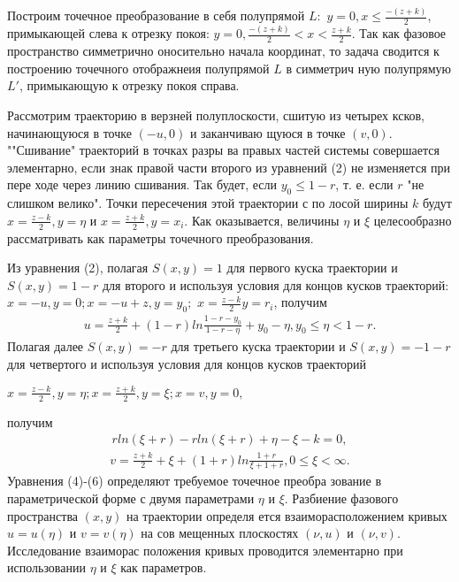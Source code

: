 \documentclass{article}
\begin{document}
Построим точечное преобразование в себя полупрямой $L:$
$y=0, x\leq\frac{-(z+k)}{2}$, примыкающей слева к отрезку покоя: $y
=0, \frac{-(z+k)}{2}<x<\frac{z+k}{2}$. Так как фазовое пространство
симметрично оносительно начала координат, то задача сводится
к построению точечного отображнеия полупрямой $L$ в симметрич
ную полупрямую $L'$, примыкающую к отрезку покоя справа.%

Рассмотрим траекторию в верзней полуплоскости, сшитую из
четырех ксков, начинающуюся в точке $(-u, 0)$ и заканчиваю
щуюся в точке $(v,0)$. ""Сшивание" траекторий в точках разры
ва правых частей системы совершается элементарно, если знак
правой части второго из уравнений (2) не изменяется при пере
ходе через линию сшивания. Так будет, если $y_{0}\leq1-r$, т. е. если
$r$ "не слишком велико". Точки пересечения этой траектории с по
лосой ширины $k$ будут $x=\frac{z-k}{2}, y=\eta$ и $x=\frac{z+k}{2}, y=x_{i}$. Как
оказывается, величины $\eta$ и $\xi$ целесообразно рассматривать как
параметры точечного преобразования.%

Из уравнения (2), полагая $S(x, y)=1$ для первого куска
траектории и $S(x, y)=1-r$ для второго и используя условия
для концов кусков траекторий: $x=-u, y=0; x=-u+z, y=y_{0};$
$x=\frac{z-k}{2} y=r_{i}$, получим
\begin{gather}
u=\frac{z+k}{2} + (1-r)ln\frac{1-r-y_{0}}{1-r-\eta}+y_{0}-\eta, y_{0}\leq\eta<1-r.
\end{gather}
Полагая далее $S(x,y)=-r$ для третьего куска траектории и
$S(x,y)=-1-r$ для четвертого и используя условия для концов
кусков траекторий
\begin{center}
$x=\frac{z-k}{2}, y=\eta; x=\frac{z+k}{2}, y=\xi; x=v, y=0,$
\end{center}
получим
\begin{gather}
r ln(\xi + r) - r ln(\xi+r)+\eta-\xi-k=0,
\end{gather}
\begin{gather}
v=\frac{z+k}{2}+\xi+(1+r)ln\frac{1+r}{\xi+1+r}, 0\leq\xi<\infty. 
\end{gather}
Уравнения (4)-(6) определяют требуемое точечное преобра
зование в параметрической форме с двумя параметрами $\eta$ и $\xi$.
Разбиение фазового пространства $(x,y)$ на траектории определя
ется взаиморасположением кривых $u=u(\eta)$ и $v=v(\eta)$ на сов
мещенных плоскостях $(\nu, u)$ и $(\nu, v)$. Исследование взаиморас
положения кривых проводится элементарно при использовании
$\eta$ и $\xi$ как параметров.%
\end{document}
